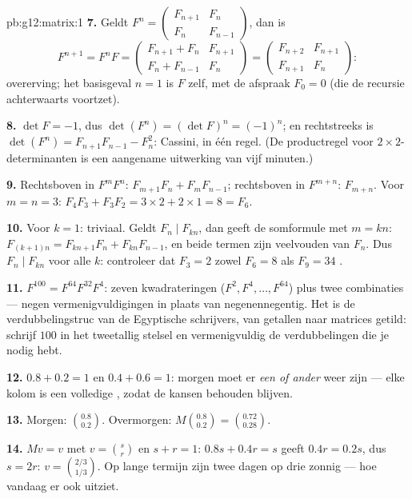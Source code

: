 \begin{solution}{pb:g12:matrix:1}
\textbf{7.} Geldt $F^n = \begin{pmatrix} F_{n+1} & F_n\\ F_n &
F_{n-1}\end{pmatrix}$, dan is
\[
F^{n+1} = F^n F =
\begin{pmatrix} F_{n+1} + F_n & F_{n+1}\\
F_n + F_{n-1} & F_n \end{pmatrix}
= \begin{pmatrix} F_{n+2} & F_{n+1}\\ F_{n+1} & F_n
\end{pmatrix} :
\]
overerving; het basisgeval $n = 1$ is $F$ zelf, met de afspraak $F_0 = 0$ (die
de recursie achterwaarts voortzet).

\textbf{8.} $\det F = -1$, dus $\det(F^n) = (\det F)^n = (-1)^n$; en
rechtstreeks is $\det(F^n) = F_{n+1}F_{n-1} - F_n^2$: Cassini, in één regel.
(De productregel voor $2 \times 2$-determinanten is een aangename uitwerking
van vijf minuten.)

\textbf{9.} Rechtsboven in $F^m F^n$: $F_{m+1}F_n + F_m F_{n-1}$; rechtsboven
in $F^{m+n}$: $F_{m+n}$. Voor $m = n = 3$:
$F_4 F_3 + F_3 F_2 = 3 \times 2 + 2 \times 1 = 8 = F_6$.

\textbf{10.} Voor $k = 1$: triviaal. Geldt $F_n \mid F_{kn}$, dan geeft de
somformule met $m = kn$: $F_{(k+1)n} = F_{kn+1}F_n + F_{kn}F_{n-1}$, en beide
termen zijn veelvouden van $F_n$. Dus $F_n \mid F_{kn}$ voor alle $k$:
controleer dat $F_3 = 2$ zowel $F_6 = 8$ als $F_9 = 34$ .

\textbf{11.} $F^{100} = F^{64} F^{32} F^4$: zeven kwadrateringen
($F^2, F^4, \dots, F^{64}$) plus twee combinaties --- negen
vermenigvuldigingen in plaats van negenennegentig. Het is de
verdubbelingstruc van de Egyptische schrijvers, van getallen naar matrices
getild: schrijf $100$ in het tweetallig stelsel en vermenigvuldig de
verdubbelingen die je nodig hebt.

\textbf{12.} $0.8 + 0.2 = 1$ en $0.4 + 0.6 = 1$: morgen moet er \emph{een of
ander} weer zijn --- elke kolom is een volledige , zodat de
kansen behouden blijven.

\textbf{13.} Morgen: $\binom{0.8}{0.2}$. Overmorgen:
$M\binom{0.8}{0.2} = \binom{0.72}{0.28}$.

\textbf{14.} $Mv = v$ met $v = \binom{s}{r}$ en $s + r = 1$:
$0.8s + 0.4r = s$ geeft $0.4r = 0.2s$, dus $s = 2r$: $v = \binom{2/3}{1/3}$.
Op lange termijn zijn twee dagen op drie zonnig --- hoe vandaag er ook uitziet.


\end{solution}
